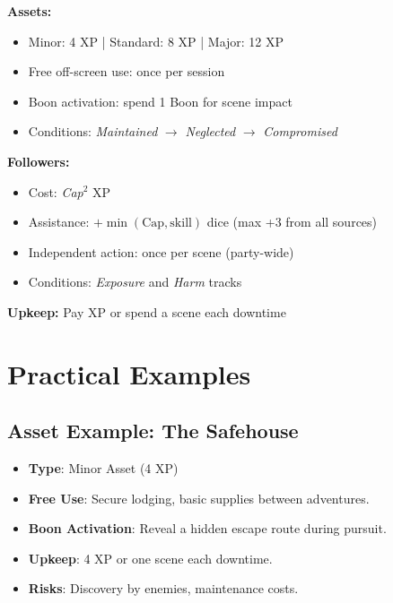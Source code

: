 \begin{tcolorbox}[colback=blue!5!white,colframe=blue!75!black,title=Assets and Followers Quick Reference,fonttitle=\bfseries]
\textbf{Assets:}
\begin{itemize}
\item Minor: 4 XP \;|\; Standard: 8 XP \;|\; Major: 12 XP
\item Free off-screen use: once per session
\item Boon activation: spend 1 Boon for scene impact
\item Conditions: \emph{Maintained} $\rightarrow$ \emph{Neglected} $\rightarrow$ \emph{Compromised}
\end{itemize}

\textbf{Followers:}
\begin{itemize}
\item Cost: \emph{Cap}$^2$ XP
\item Assistance: $+\min(\text{Cap},\text{skill})$ dice (max +3 from all sources)
\item Independent action: once per scene (party-wide)
\item Conditions: \emph{Exposure} and \emph{Harm} tracks
\end{itemize}

\textbf{Upkeep:} Pay XP or spend a scene each downtime
\end{tcolorbox}

\section{Practical Examples}

\subsection*{Asset Example: The Safehouse}
\begin{itemize}
\item \textbf{Type}: Minor Asset (4 XP)
\item \textbf{Free Use}: Secure lodging, basic supplies between adventures.
\item \textbf{Boon Activation}: Reveal a hidden escape route during pursuit.
\item \textbf{Upkeep}: 4 XP or one scene each downtime.
\item \textbf{Risks}: Discovery by enemies, maintenance costs.
\end{itemize}

